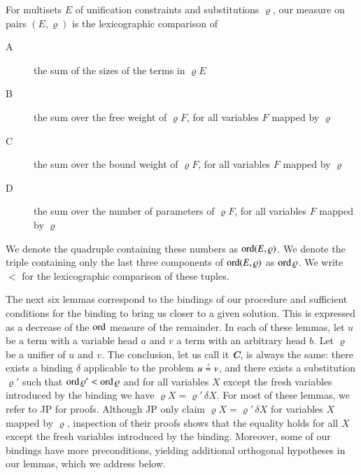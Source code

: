     \begin{defi}[$\jp D8$] \label{unif:def:ord}
    For multisets $E$ of unification constraints and
    substitutions $\varrho$, our measure on pairs $(E, \varrho)$
    is the lexicographic comparison of
    \begin{description}
      \item[A] the sum of the sizes of the terms in $\varrho E$
      \item[B] the sum over the free weight of $\varrho F$, 
        for all variables $F$ mapped by $\varrho$
      \item[C] the sum over the bound weight of $\varrho F$, 
      for all variables $F$ mapped by $\varrho$
      \item[D] the sum over the number of parameters of $\varrho F$, 
      for all variables $F$ mapped by $\varrho$
    \end{description}
    We denote the quadruple containing these numbers as $\operatorname{ord}(E,\varrho)$.
    We denote the triple containing only the last three components of $\operatorname{ord}(E,\varrho)$ as $\operatorname{ord} \varrho$.
    We write $<$ for the lexicographic comparison of these tuples.
    \end{defi}

    The next six lemmas correspond to the bindings of our procedure and sufficient
    conditions for the binding to bring us closer to a given solution. 
    This is expressed as a decrease of the $\operatorname{ord}$ measure
    of the remainder. In each of these lemmas, 
    let $u$ be a term with a variable head $a$ and
    $v$ a term with an arbitrary head $b$.
    Let $\varrho$ be a unifier of $u$ and $v$.
    The conclusion, let us call it \textbf{\emph{C}},
    is always the same: there exists a binding $\delta$ applicable to the problem $ u\unif v$, and
    there exists a substitution $\varrho'$ such that $\operatorname{ord}\varrho'<\operatorname{ord}\varrho$
    and for all variables $X$ except the fresh variables introduced by the binding we have  $\varrho X= \varrho'\, \delta X$.
    For most of these lemmas, we refer to JP \cite{jp-76-unif} for proofs.
    Although JP only claim $\varrho X= \varrho'\, \delta X$
    for variables $X$ mapped by $\varrho$,
    inspection of their proofs shows that the equality holds for 
    all $X$ except the fresh variables introduced by the binding.
    Moreover, some of our bindings have more preconditions, 
    yielding additional orthogonal hypotheses in our lemmas,
    which we address below.

